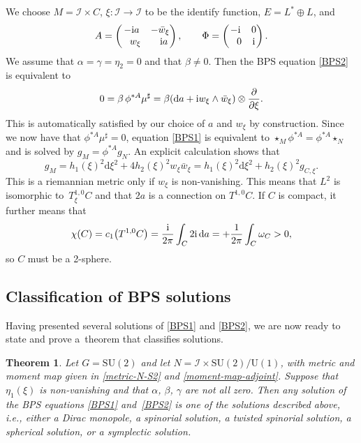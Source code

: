 \documentclass[10pt,a4paper]{amsart}
\newcommand{\II}{{\mathcal{I}}}
\newcommand{\SU}{{\mathrm{SU}}}
\newcommand{\U}{{\mathrm{U}}}
\newcommand{\1}{{\mathbb{1}}}
\def \d{\mathrm{d}}
\numberwithin{equation}{section}
\newtheorem{Theorem}{Theorem}[section]
\begin{document}
We choose $M=\II\times C$, $\xi\colon \II\to \II$ to be the identify function, $E=L^\ast\oplus L$, and
\begin{equation*}
A=\begin{pmatrix}-{\rm i}a & -\bar{w}_\xi \\ \hphantom{-} w_\xi & \hphantom{-}{\rm i} a \end{pmatrix},\qquad \Phi=\begin{pmatrix}-{\rm i} & 0 \\ \hphantom{-}0 & {\rm i} \end{pmatrix}.
\end{equation*}
We assume that $\alpha=\gamma=\eta_2=0$ and that $\beta\neq0$. Then the BPS equation \eqref{BPS2} is equivalent to
\begin{equation*}
0 = \beta\,\phi^{\ast A}\mu^\sharp = \beta(\d a +{\rm i}w_\xi\wedge\bar{w}_\xi)\otimes\frac{\partial}{\partial\xi}.
\end{equation*}
This is automatically satisfied by our choice of $a$ and $w_\xi$ by construction. Since we now have that $\phi^{\ast A}\mu^\sharp=0$, equation \eqref{BPS1} is equivalent to $\star_M\phi^{\ast A}=\phi^{\ast A}\star_N$ and is solved by $g_M=\phi^{\ast A} g_N$. An explicit calculation shows that
\begin{equation*}
g_M = h_1(\xi)^2\d\xi^2 + 4h_2(\xi)^2 w_\xi\bar{w}_\xi = h_1(\xi)^2\d\xi^2 + h_2(\xi)^2 g_{C,\xi}.
\end{equation*}
This is a riemannian metric only if $w_\xi$ is non-vanishing. This means that $L^2$ is isomorphic to~$T^{1,0}_\xi C$ and that $2a$ is a connection on $T^{1,0}C$. If $C$ is compact, it further means that
\begin{equation*}
\chi(C) = c_1\big(T^{1,0}C\big) = \frac{{\rm i}}{2\pi}\int_C 2{\rm i}\,\d a = +\frac{1}{2\pi}\int_C \omega_C > 0,
\end{equation*}
so $C$ must be a 2-sphere.

\subsection{Classification of BPS solutions}

Having presented several solutions of \eqref{BPS1} and \eqref{BPS2}, we are now ready to state and prove a~theorem that classifies solutions.

\begin{Theorem}\label{thm:classification-S2}
Let $G=\SU(2)$ and let $N=\II\times \SU(2)/\U(1)$, with metric and moment map given in \eqref{metric-N-S2} and \eqref{moment-map-adjoint}. Suppose that $\eta_1(\xi)$ is non-vanishing and that $\alpha$, $\beta$, $\gamma$ are not all zero. Then any solution of the BPS equations \eqref{BPS1} and~\eqref{BPS2} is one of the solutions described above, i.e., either a Dirac monopole, a spinorial solution, a twisted spinorial solution, a spherical solution, or a symplectic solution.
\end{Theorem}
\end{document}
